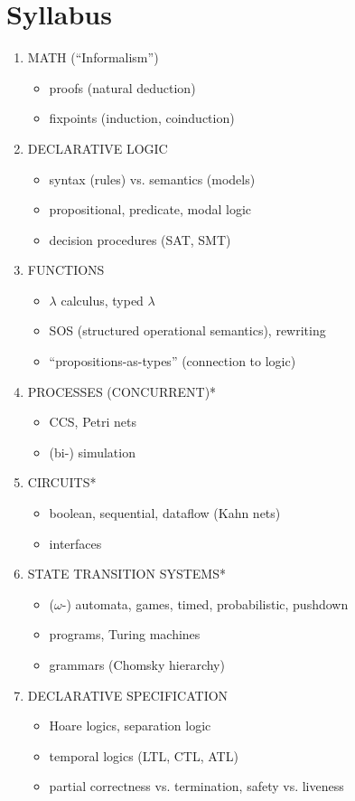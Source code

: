 {{\section{Syllabus}
\begin{enumerate}
  \item MATH (``Informalism'')
  \begin{itemize}
    \item proofs (natural deduction)
    \item fixpoints (induction, coinduction)
  \end{itemize}
  \item DECLARATIVE LOGIC
  \begin{itemize}
    \item syntax (rules) vs. semantics (models)
    \item propositional, predicate, modal logic 
    \item decision procedures (SAT, SMT)
  \end{itemize}
  \item FUNCTIONS
  \begin{itemize}
    \item $\lambda$ calculus, typed $\lambda$
    \item SOS (structured operational semantics), rewriting
    \item ``propositions-as-types'' (connection to logic)
  \end{itemize}
  \item PROCESSES (CONCURRENT)* 
  \begin{itemize}
    \item CCS, Petri nets
    \item (bi-) simulation
  \end{itemize}
  \item CIRCUITS*
  \begin{itemize}
    \item boolean, sequential, dataflow (Kahn nets)
    \item interfaces
  \end{itemize}
  \item STATE TRANSITION SYSTEMS*
  \begin{itemize}
    \item ($\omega$-) automata, games, timed, probabilistic, pushdown
    \item programs, Turing machines 
    \item grammars (Chomsky hierarchy)
  \end{itemize} 
  \item DECLARATIVE SPECIFICATION
  \begin{itemize}
    \item Hoare logics, separation logic 
    \item temporal logics (LTL, CTL, ATL)
    \item partial correctness vs. termination, safety vs. liveness 
  \end{itemize}
\end{enumerate}

}}
